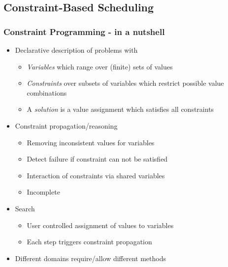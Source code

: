 \subsection{Constraint-Based Scheduling}

\begin{frame}
\frametitle{Constraint Programming - in a nutshell}
\begin{itemize}
\item Declarative description of problems with
\begin{itemize}
\item {\em Variables} which range over (finite) sets of values
\item {\em Constraints} over subsets of variables which restrict possible value combinations
\item A {\em solution} is a value assignment which satisfies all constraints
\end{itemize}

\item Constraint propagation/reasoning
\begin{itemize}
\item Removing inconsistent values for variables
\item Detect failure if constraint can not be satisfied
\item Interaction of constraints via shared variables
\item Incomplete
\end{itemize}

\item Search
\begin{itemize}
\item User controlled assignment of values to variables
\item Each step triggers constraint propagation 
\end{itemize}
\item Different domains require/allow different methods
\end{itemize}
\end{frame}

